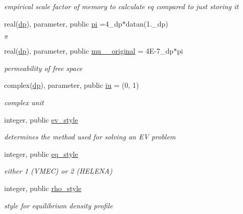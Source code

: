 \begin{DoxyCompactItemize}
\begin{DoxyCompactList}\small\item\em empirical scale factor of memory to calculate eq compared to just storing it \end{DoxyCompactList}\item 
real(\hyperlink{namespacenum__vars_a03802aa2bd86439d7a9370836fabf3f2}{dp}), parameter, public \hyperlink{namespacenum__vars_a26f47310576a3414135b3d3fcc079709}{pi} =4\+\_\+dp$\ast$datan(1.\+\_\+dp)
\begin{DoxyCompactList}\small\item\em $\pi$ \end{DoxyCompactList}\item 
real(\hyperlink{namespacenum__vars_a03802aa2bd86439d7a9370836fabf3f2}{dp}), parameter, public \hyperlink{namespacenum__vars_a50e309ca1a5833d2838ed7457b7eb686}{mu\+\_\+\_\+original} = 4\+E-\/7\+\_\+dp$\ast$pi
\begin{DoxyCompactList}\small\item\em permeability of free space \end{DoxyCompactList}\item 
complex(\hyperlink{namespacenum__vars_a03802aa2bd86439d7a9370836fabf3f2}{dp}), parameter, public \hyperlink{namespacenum__vars_a3b9303c24ebbdff7b366337702795211}{iu} = (0, 1)
\begin{DoxyCompactList}\small\item\em complex unit \end{DoxyCompactList}\item 
integer, public \hyperlink{namespacenum__vars_aae749d5063afce3b912a097ff0993d00}{ev\+\_\+style}
\begin{DoxyCompactList}\small\item\em determines the method used for solving an EV problem \end{DoxyCompactList}\item 
integer, public \hyperlink{namespacenum__vars_a7d8763402037dbb80db19e2534ddf595}{eq\+\_\+style}
\begin{DoxyCompactList}\small\item\em either 1 (V\+M\+EC) or 2 (H\+E\+L\+E\+NA) \end{DoxyCompactList}\item 
integer, public \hyperlink{namespacenum__vars_a787c23d10a522ff93cf555587b71cc0d}{rho\+\_\+style}
\begin{DoxyCompactList}\small\item\em style for equilibrium density profile \end{DoxyCompactList}\item 

\end{DoxyCompactItemize}
